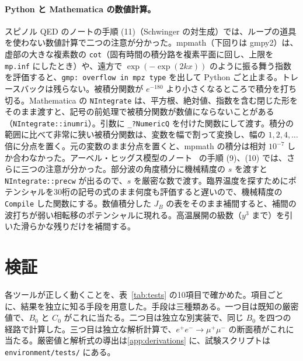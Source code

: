 \documentclass[a4paper,10pt]{ltjsarticle}
\begin{document}
\paragraph{Python と Mathematica の数値計算。}スピノル QED のノートの手順 (11)（Schwinger の対生成）では、ループの道具を使わない数値計算で二つの注意が分かった。mpmath（下回りは gmpy2）は、虚部の大きな複素数の \texttt{cot}（固有時間の積分路を複素平面に回し、上限を \texttt{mp.inf} にしたとき）や、遠方で $\exp(-\exp(2kx))$ のように振る舞う指数を評価すると、\texttt{gmp: overflow in mpz type} を出して Python ごと止まる。トレースバックは残らない。被積分関数が $e^{-180}$ より小さくなるところで積分を打ち切る。Mathematica の \texttt{NIntegrate} は、平方根、絶対値、指数を含む閉じた形をそのまま渡すと、記号の前処理で被積分関数が数値にならないことがある（\texttt{NIntegrate::inumri}）。引数に \texttt{\_?NumericQ} を付けた関数にして渡す。積分の範囲に比べて非常に狭い被積分関数は、変数を幅で割って変換し、幅の $1,2,4,\dots$ 倍に分点を置く。元の変数のまま分点を置くと、mpmath の積分は相対 $10^{-7}$ しか合わなかった。アーベル・ヒッグス模型のノート~\cite{ahnote} の手順 (9)、(10) では、さらに三つの注意が分かった。部分波の角度積分に機械精度の $s$ を渡すと \texttt{NIntegrate::precw} が出るので、$s$ を厳密な数で渡す。臨界温度を探すためにポテンシャルを30桁の記号の式のまま何度も評価すると遅いので、機械精度の \texttt{Compile} した関数にする。数値積分した $J_B$ の表をそのまま補間すると、補間の波打ちが弱い相転移のポテンシャルに現れる。高温展開の級数（$y^3$ まで）を引いた滑らかな残りだけを補間する。

\section{検証}\label{sec:tests}

各ツールが正しく動くことを、表~\ref{tab:tests} の10項目で確かめた。項目ごとに、結果を独立に知る手段を用意した。手段は三種類ある。一つ目は既知の厳密値で、$B_0$ と $C_0$ がこれに当たる。二つ目は独立な別実装で、同じ $B_0$ を四つの経路で計算した。三つ目は独立な解析計算で、$e^+e^-\to\mu^+\mu^-$ の断面積がこれに当たる。厳密値と解析式の導出は\ref{app:derivations} に、試験スクリプトは \nolinkurl{environment/tests/} にある。
\end{document}

